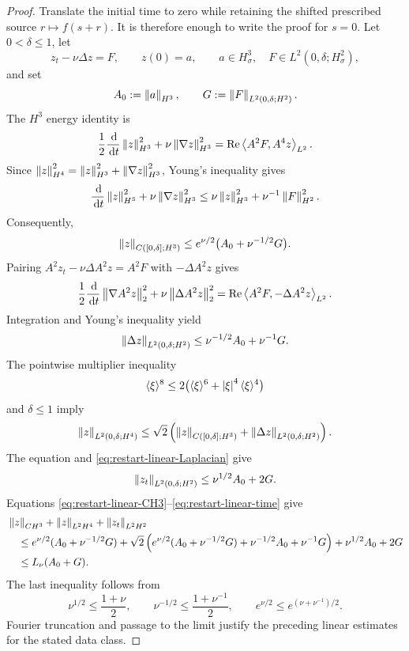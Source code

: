 \begin{proof}
Translate the initial time to zero while retaining the shifted prescribed
source \(r\mapsto f(s+r)\).  It is therefore enough to write the proof for
\(s=0\).
Let \(0<\delta\le1\), let
\[
 z_t-\nu\Delta z=F,
 \qquad z(0)=a,
 \qquad
 a\in H^3_\sigma,\quad
 F\in L^2(0,\delta;H^2_\sigma),
\]
and set
\[
 A_0:=\left\lVert a\right\rVert_{H^3},
 \qquad
 G:=\left\lVert F\right\rVert_{L^2(0,\delta;H^2)}.
\]
The \(H^3\) energy identity is
\[
 \frac12\frac{\,\mathrm d}{\,\mathrm d t}\left\lVert z\right\rVert_{H^3}^2
 +\nu\left\lVert \nabla z\right\rVert_{H^3}^2
 =\operatorname{Re}\left\langle A^2F,A^4z\right\rangle_{L^2}.
\]
Since
\(\left\lVert z\right\rVert_{H^4}^2=\left\lVert z\right\rVert_{H^3}^2+\left\lVert \nabla z\right\rVert_{H^3}^2\),
Young's inequality gives
\[
 \frac{\,\mathrm d}{\,\mathrm d t}\left\lVert z\right\rVert_{H^3}^2
 +\nu\left\lVert \nabla z\right\rVert_{H^3}^2
 \le \nu\left\lVert z\right\rVert_{H^3}^2+\nu^{-1}\left\lVert F\right\rVert_{H^2}^2.
\]
Consequently,
\begin{equation}
 \left\lVert z\right\rVert_{C([0,\delta];H^3)}
 \le e^{\nu/2}\bigl(A_0+\nu^{-1/2}G\bigr).
 \label{eq:restart-linear-CH3}
\end{equation}
Pairing \(A^2z_t-\nu\Delta A^2z=A^2F\) with
\(-\Delta A^2z\) gives
\[
 \frac12\frac{\,\mathrm d}{\,\mathrm d t}\left\lVert \nabla A^2z\right\rVert_2^2
 +\nu\left\lVert \Delta A^2z\right\rVert_2^2
 =\operatorname{Re}\left\langle A^2F,-\Delta A^2z\right\rangle_{L^2}.
\]
Integration and Young's inequality yield
\begin{equation}
 \left\lVert \Delta z\right\rVert_{L^2(0,\delta;H^2)}
 \le \nu^{-1/2}A_0+\nu^{-1}G.
 \label{eq:restart-linear-Laplacian}
\end{equation}
The pointwise multiplier inequality
\[
 \langle\xi\rangle^8
 \le2\bigl(\langle\xi\rangle^6
       +\left|\xi\right|^4\langle\xi\rangle^4\bigr)
\]
and \(\delta\le1\) imply
\begin{equation}
 \left\lVert z\right\rVert_{L^2(0,\delta;H^4)}
 \le\sqrt2\left(
 \left\lVert z\right\rVert_{C([0,\delta];H^3)}
 +\left\lVert \Delta z\right\rVert_{L^2(0,\delta;H^2)}
 \right).
 \label{eq:restart-linear-H4}
\end{equation}
The equation and \eqref{eq:restart-linear-Laplacian} give
\begin{equation}
 \left\lVert z_t\right\rVert_{L^2(0,\delta;H^2)}
 \le\nu^{1/2}A_0+2G.
 \label{eq:restart-linear-time}
\end{equation}
Equations \eqref{eq:restart-linear-CH3}--\eqref{eq:restart-linear-time}
give
\begin{align*}
 &\left\lVert z\right\rVert_{C H^3}+\left\lVert z\right\rVert_{L^2H^4}+\left\lVert z_t\right\rVert_{L^2H^2}\\
 &\quad\le
 e^{\nu/2}(A_0+\nu^{-1/2}G)
 +\sqrt2\left(
 e^{\nu/2}(A_0+\nu^{-1/2}G)
 +\nu^{-1/2}A_0+\nu^{-1}G\right)
 +\nu^{1/2}A_0+2G\\
 &\quad\le L_\nu(A_0+G).
\end{align*}
The last inequality follows from
\[
 \nu^{1/2}\le\frac{1+\nu}{2},
 \qquad
 \nu^{-1/2}\le\frac{1+\nu^{-1}}2,
 \qquad
 e^{\nu/2}\le e^{(\nu+\nu^{-1})/2}.
\]
Fourier truncation and passage to the limit justify the preceding linear
estimates for the stated data class.


\end{proof}
